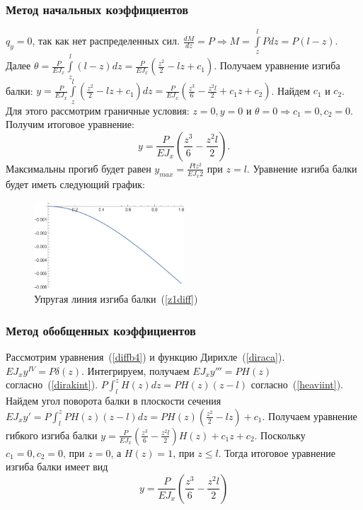 \documentclass[12pt, a4paper]{article}
\begin{document}
\subsubsection{Метод начальных коэффициентов}
$q_{y} =  0$, так как нет распределенных сил. $\frac{d M}{d z} = P \Rightarrow M = \int\limits_z^l P d z = P(l - z)$. Далее $\theta = \frac{P}{E J_{x}} \int\limits_z^l (l - z)d z = \frac{P}{E J_{x}} (\frac{z^2}{2} - l z + c_1)$. Получаем уравнение изгиба балки: $y = \frac{P}{E J_{x}} \int\limits_z^l (\frac{z^2}{2} - l z + c_1) d z = \frac{P}{E J_{x}} (\frac{z^3}{6} - \frac{z^2 l}{2} + c_1 z + c_2)$. Найдем $c_1$ и $c_2$. Для этого рассмотрим граничные условия: $z = 0, y = 0 \mbox{ и } \theta = 0 \Rightarrow c_1 = 0, c_2 = 0$. Получим итоговое уравнение: 
\begin{equation}
	\label{z1diff}
	y = \frac{P}{E J_{x}} (\frac{z^3}{6} - \frac{z^2 l}{2}).
\end{equation}
Максимальны прогиб будет равен $y_{max} = \frac{P l z^2}{E J_{x} 2}$ при $z = l$.
Уравнение изгиба балки будет иметь следующий график:
\begin{figure}[!h]
	\centering
	\includegraphics[width=0.5\textwidth]{g.1}%
	\caption{Упругая линия изгиба балки~(\ref{z1diff})}
	\vspace*{-2mm}
	\label{g1}
\end{figure}

\subsubsection{Метод обобщенных коэффициентов}

Рассмотрим уравнения~(\ref{diffb4}) и функцию Дирихле~(\ref{diraca}). 
$E J_{x} y^{IV} = P \delta (z)$. Интегрируем, получаем $E J_{x} y''' = P H (z)$ согласно~(\ref{dirakint}). $P \int_l^z  H (z) dz = P H (z) (z - l)$ согласно~(\ref{heaviint}). Найдем угол поворота балки в плоскости сечения $E J_{x} y' = P \int_l^z P H (z) (z - l) dz = P H(z)(\frac{z^2}{2} - l z) + c_1$. Получаем уравнение гибкого изгиба балки $y = \frac{P}{E J_{x}} (\frac{z^3}{6} - \frac{z^2 l}{2}) H(z) + c_1 z + c_2$. Поскольку $c_1 = 0, c_2 = 0 \mbox{, при } z = 0$, а $H(z) = 1 \mbox{, при } z \leqslant l$. Тогда итоговое уравнение изгиба балки имеет вид
\begin{equation}
	\label{z1ob}
	y = \frac{P}{E J_{x}} (\frac{z^3}{6} - \frac{z^2  l}{2})
\end{equation}
\end{document}
